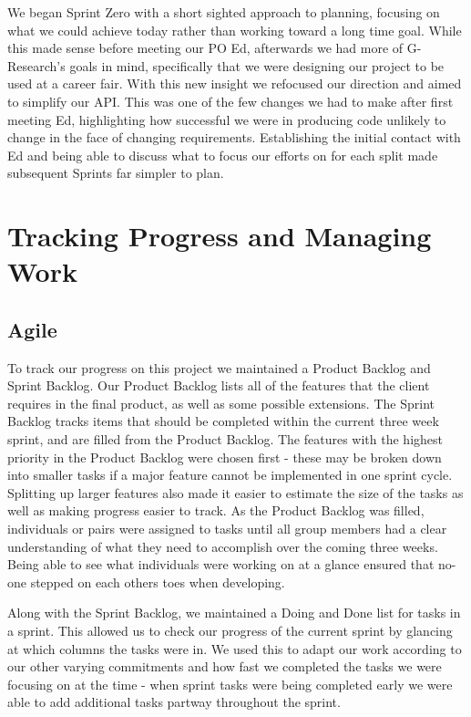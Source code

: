 We began Sprint Zero with a short sighted approach to planning, focusing on what we could achieve today rather than working toward a long time goal. While this made sense before meeting our PO Ed, afterwards we had more of G-Research's goals in mind, specifically that we were designing our project to be used at a career fair. With this new insight we refocused our direction and aimed to simplify our API. This was one of the few changes we had to make after first meeting Ed, highlighting how successful we were in producing code unlikely to change in the face of changing requirements. Establishing the initial contact with Ed and being able to discuss what to focus our efforts on for each split made subsequent Sprints far simpler to plan.

\section{Tracking Progress and Managing Work}

\subsection{Agile}
To track our progress on this project we maintained a Product Backlog and Sprint Backlog. Our Product Backlog lists all of the features that the client requires in the final product, as well as some possible extensions. The Sprint Backlog tracks items that should be completed within the current three week sprint, and are filled from the Product Backlog. The features with the highest priority in the Product Backlog were chosen first - these may be broken down into smaller tasks if a major feature cannot be implemented in one sprint cycle. Splitting up larger features also made it easier to estimate the size of the tasks as well as making progress easier to track. As the Product Backlog was filled, individuals or pairs were assigned to tasks until all group members had a clear understanding of what they need to accomplish over the coming three weeks. Being able to see what individuals were working on at a glance ensured that no-one stepped on each others toes when developing.

Along with the Sprint Backlog, we maintained a Doing and Done list for tasks in a sprint. This allowed us to check our progress of the current sprint by glancing at which columns the tasks were in. We used this to adapt our work according to our other varying commitments and how fast we completed the tasks we were focusing on at the time - when sprint tasks were being completed early we were able to add additional tasks partway throughout the sprint.

